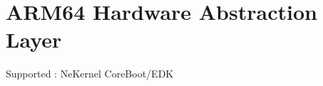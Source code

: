 \chapter{ARM64 Hardware Abstraction Layer}
\hypertarget{md_dev_2kernel_2_h_a_l_kit_2_a_r_m64_2_read_me}{}\label{md_dev_2kernel_2_h_a_l_kit_2_a_r_m64_2_read_me}
\label{md_dev_2kernel_2_h_a_l_kit_2_a_r_m64_2_read_me_autotoc_md4}%
%

\begin{DoxyItemize}
\item Supported \+: Ne\+Kernel Core\+Boot/\+EDK 
\end{DoxyItemize}